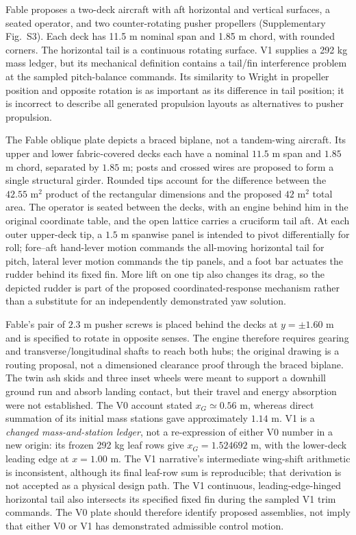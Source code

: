 \documentclass[11pt,a4paper]{article}
\begin{document}
Fable proposes a two-deck aircraft with aft horizontal and vertical surfaces, a seated operator, and two counter-rotating pusher propellers (Supplementary Fig.~S3). Each deck has 11.5 m nominal span and 1.85 m chord, with rounded corners. The horizontal tail is a continuous rotating surface. V1 supplies a 292 kg mass ledger, but its mechanical definition contains a tail/fin interference problem at the sampled pitch-balance commands. Its similarity to Wright in propeller position and opposite rotation is as important as its difference in tail position; it is incorrect to describe all generated propulsion layouts as alternatives to pusher propulsion.



The Fable oblique plate depicts a braced biplane, not a tandem-wing aircraft. Its upper and lower fabric-covered decks each have a nominal $11.5$ m span and $1.85$ m chord, separated by $1.85$ m; posts and crossed wires are proposed to form a single structural girder. Rounded tips account for the difference between the $42.55$ m$^2$ product of the rectangular dimensions and the proposed $42$ m$^2$ total area. The operator is seated between the decks, with an engine behind him in the original coordinate table, and the open lattice carries a cruciform tail aft. At each outer upper-deck tip, a $1.5$ m spanwise panel is intended to pivot differentially for roll; fore--aft hand-lever motion commands the all-moving horizontal tail for pitch, lateral lever motion commands the tip panels, and a foot bar actuates the rudder behind its fixed fin. More lift on one tip also changes its drag, so the depicted rudder is part of the proposed coordinated-response mechanism rather than a substitute for an independently demonstrated yaw solution.

Fable's pair of $2.3$ m pusher screws is placed behind the decks at $y=\pm1.60$ m and is specified to rotate in opposite senses. The engine therefore requires gearing and transverse/longitudinal shafts to reach both hubs; the original drawing is a routing proposal, not a dimensioned clearance proof through the braced biplane. The twin ash skids and three inset wheels were meant to support a downhill ground run and absorb landing contact, but their travel and energy absorption were not established. The V0 account stated $x_G\simeq0.56$ m, whereas direct summation of its initial mass stations gave approximately $1.14$ m. V1 is a \emph{changed mass-and-station ledger}, not a re-expression of either V0 number in a new origin: its frozen 292 kg leaf rows give $x_G=1.524692$ m, with the lower-deck leading edge at $x=1.00$ m. The V1 narrative's intermediate wing-shift arithmetic is inconsistent, although its final leaf-row sum is reproducible; that derivation is not accepted as a physical design path. The V1 continuous, leading-edge-hinged horizontal tail also intersects its specified fixed fin during the sampled V1 trim commands. The V0 plate should therefore identify proposed assemblies, not imply that either V0 or V1 has demonstrated admissible control motion.
\end{document}
